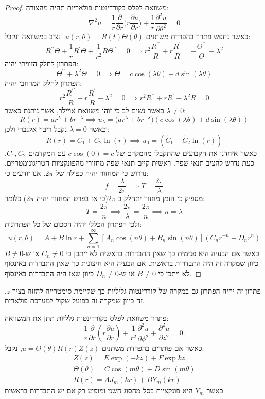 \documentclass{tstextbook}
\begin{document}
\begin{proof}
משוואת לפלס בקורדינטות פולאריות תהיה מהצורה:
$$\nabla^{2}u={\frac{1}{r}}{\frac{\partial}{\partial r}}\Big(r{\frac{\partial u}{\partial r}}\Big)+{\frac{1}{r}}{\frac{\partial^{2}u}{\partial\theta^{2}}}=0$$
כאשר נחפש פתרון בהפרדת משתנים \(u\left( r,\theta \right)=R(t)\Theta\left( \theta \right)\). נציב במשוואה ונקבל:
$$R^{\prime\prime}\Theta+\frac{1}{r}R^{\prime}\Theta+\frac{1}{r^{2}}R\Theta^{\prime\prime}=0\implies r^{2}\frac{R^{\prime\prime}}{R}+r\frac{R^{\prime}}{R}=-\frac{\Theta^{\prime\prime}}{\Theta}\equiv\lambda^{2}$$
הפתרון לחלק הזוויתי יהיה:
$$\Theta^{\prime\prime}+\lambda^{2}\Theta=0\implies\Theta=c\cos\left( \lambda\theta \right)+d\sin\left( \lambda\theta \right)$$
הפתרון לחלק המרחבי יהיה:
$$r^{2}\frac{R^{\prime\prime}}{R}+r\frac{R^{\prime}}{R}-\lambda^{2}=0\implies r^{2}R^{\prime\prime}+r R^{\prime}-\lambda^{2}R=0$$
כאשר נשים לב כי זוהי משוואת אויילר, אשר נותנת כאשר \(\lambda \neq 0\):
$$R(r)=ar^{\lambda}+br^{-\lambda}\implies u_{\lambda}=\bigl(a r^{\lambda}+b r^{-\lambda}\bigr)(c\cos(\lambda\theta)+d\sin(\lambda\theta))$$
וכאשר \(\lambda=0\) נקבל ריבוי אלגברי ולכן:
$$R(r)=C_{1}+C_{2}\ln(r)\implies u_{0}=\left( \tilde{C}_{1}+\tilde{C}_{2}\ln(r) \right)$$
כאשר איחדנו את הקבועים שהתקבלו מהמקדם של \(c\cos(0)=c\) עם המקדמים \(C_{1},C_{2}\).
כעת נדרש להציב תנאי שפה. ראשית קיים תנאי שפה מחזורי מהפונקציות הטריגונומטריים, נדרוש כי המחזור יהיה כפולה של \(2\pi\). אנו יודעים כי:
$$f=\frac{\lambda}{2\pi}\implies T=\frac{2\pi}{\lambda}$$
מספיק כי הזמן מחזור יתחלק ב-\(2\pi\)(כי אז בפרט המחזור יהיה \(2\pi\)) כלומר:
$$T\overset{!}{=}  \frac{2\pi}{n}\implies \frac{2\pi}{\lambda}=\frac{2\pi}{n}\implies n=\lambda$$
ולכן הפתרון הכללי יהיה הסכום של כל הפתרונות:
$$\!\!\!u(r,\theta)\!=\!A\!+\!B\ln r\!+\!\sum_{n=1}^\infty\left[A_n\cos(n\theta)\!+\!B_n\sin(n\theta)\right](C_{n}r^{-n}\!+\!D_{n}r^n)$$
כאשר אם הבעיה היא פנימית כך שאין התבדרות בראשית לא ייתכן כי \(C_{n}\neq 0\) או ש-\(B\neq 0\) כיוון שמקרה זה היה התבדרות בראשית.
אם הבעיה היא חיצונית כך שאין התברדות באינסוף לא ייתכן כי \(B\neq 0\) או ש-\(D_{n}\neq 0\) כיוון שאז היה התבדרות באינסוף.

\end{proof}
\begin{remark}
פתרון זה יהיה הפתרון גם במקרה של קורדינטות גליליות כך שקיימת סימטרייה להזזה בציר \(z\). זה כיוון שמקרה זה בפועל שקול למערכת פולארית.

\end{remark}
\begin{proposition}
פתרון משוואת לפלס בקורדינטות גלליות תתן את המשוואה:
$$ \frac{1}{r }\frac{\partial}{\partial r}\left(r \frac{\partial u}{\partial r }\right)+\frac{1}{ r ^{2}}\frac{\partial^{2}u}{\partial\phi^{2}}+\frac{\partial^{2}u}{\partial z^{2}}=0.$$
כאשר אם פותרים בהפרדת משתנים \(u=\Theta\left( \theta \right)R(r)Z(z)\), נקבל:
$$\begin{gather}  Z(z)=E\exp(-kz)+F\exp kz\\ \Theta\left( \theta \right)=C\cos \left( m\theta \right)+D\sin \left( m\theta \right) \\R(r)=AJ_m(kr)+BY_m(kr)
\end{gather}$$
כאשר \(Y_{m}\) היא פונקציית בסל מהסוג השני ומופיע רק אם יש התבדרות בראשית.

\end{proposition}
\end{document}
